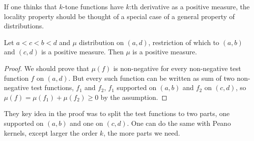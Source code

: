 If one thinks that $k$-tone functions have $k$:th derivative as a positive measure, the locality property should be thought of a special case of a general property of distributions.
\begin{prop}
	Let $a < c < b < d$ and $\mu$ distribution on $(a, d)$, restriction of which to $(a, b)$ and $(c, d)$ is a positive measure. Then $\mu$ is a positive measure.
\end{prop}
\begin{proof}
	We should prove that $\mu(f)$ is non-negative for every non-negative test function $f$ on $(a, d)$. But every such function can be written as sum of two non-negative test functions, $f_{1}$ and $f_{2}$, $f_{1}$ supported on $(a, b)$ and $f_{2}$ on $(c, d)$, so $\mu(f) = \mu(f_{1}) + \mu(f_{2}) \geq 0$ by the assumption.
\end{proof}

They key idea in the proof was to split the test functions to two parts, one supported on $(a, b)$ and one on $(c, d)$. One can do the same with Peano kernels, except larger the order $k$, the more parts we need. 

